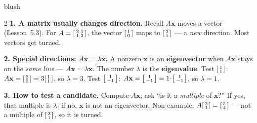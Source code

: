 \documentclass[10pt]{article}
\newcommand{\xx}{\mathbf{x}}
\begin{document}
\begin{skillbox}[Lesson]{blush}
\begin{multicols}{2}
\textbf{1. A matrix usually changes direction.} Recall $A\xx$ moves a vector (Lesson~5.3). For
$A=\begin{bsmallmatrix}2&1\\1&2\end{bsmallmatrix}$, the vector
$\begin{bsmallmatrix}1\\0\end{bsmallmatrix}$ maps to $\begin{bsmallmatrix}2\\1\end{bsmallmatrix}$ ---
a \emph{new} direction. Most vectors get turned.

\textbf{2. Special directions: $A\xx=\lambda\xx$.} A nonzero $\xx$ is an \textbf{eigenvector} when
$A\xx$ stays on the \emph{same line} --- $A\xx=\lambda\xx$. The number $\lambda$ is the
\textbf{eigenvalue}. Test $\begin{bsmallmatrix}1\\1\end{bsmallmatrix}$: $A\xx=
\begin{bsmallmatrix}3\\3\end{bsmallmatrix}=3\begin{bsmallmatrix}1\\1\end{bsmallmatrix}$, so
$\lambda=3$. Test $\begin{bsmallmatrix}1\\-1\end{bsmallmatrix}$: $A\xx=
\begin{bsmallmatrix}1\\-1\end{bsmallmatrix}=1\!\cdot\!\begin{bsmallmatrix}1\\-1\end{bsmallmatrix}$,
so $\lambda=1$.

\columnbreak

\textbf{3. How to test a candidate.} Compute $A\xx$; ask ``is it a \emph{multiple} of $\xx$?'' If yes,
that multiple is $\lambda$; if no, $\xx$ is not an eigenvector. Non-example: $A
\begin{bsmallmatrix}2\\1\end{bsmallmatrix}=\begin{bsmallmatrix}5\\4\end{bsmallmatrix}$ --- not a
multiple of $\begin{bsmallmatrix}2\\1\end{bsmallmatrix}$, so it is turned.


\end{multicols}
\end{skillbox}
\end{document}
